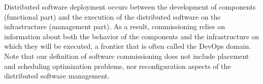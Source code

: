Distributed software deployment occurs between the development of
components (functional part) and the execution of the distributed
software on the infrastructure (management part). As a result,
commissioning relies on information about both the behavior of the
components and the infrastructure on which they will be executed, a
frontier that is often called the DevOps domain. Note that our
definition of software commissioning does not include placement and
scheduling optimization problems, nor reconfiguration aspects of the
distributed software management.


